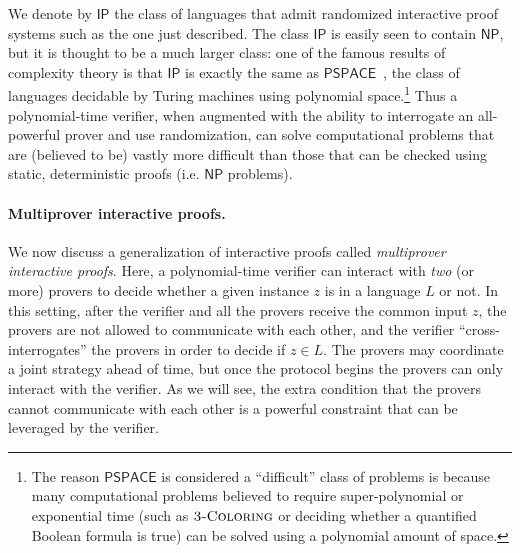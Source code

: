\documentclass[11pt]{article}
\theoremstyle{definition}
\newcommand{\class}[1]{\ensuremath{\mathsf{#1}}\xspace}
\newcommand{\NP}{\class{NP}} %
\newcommand{\IP}{\class{IP}} %
\newcommand{\tnote}[1]{}
\newcommand{\hnote}[1]{}
\begin{document}

We denote by $\IP$ the class of languages that admit randomized interactive proof systems such as the one just described. 
The class $\IP$ is easily seen to contain $\NP$, but it is thought to be a much larger class: one of the famous results of complexity theory is that $\IP$ is exactly the same as $\mathsf{PSPACE}$~\cite{lund1990algebraic,shamir1990ip}, the class of languages decidable by Turing machines using polynomial space.\footnote{The reason $\mathsf{PSPACE}$ is considered a ``difficult'' class of problems is because many computational problems believed to require super-polynomial or exponential time (such as $\textsc{3-Coloring}$ or deciding whether a quantified Boolean formula is true) can be solved using a polynomial amount of space.} Thus a polynomial-time verifier, when augmented with the ability to interrogate an all-powerful prover and use randomization, can solve computational problems that are (believed to be) vastly more difficult than those that can be checked using static, deterministic proofs (i.e. $\mathsf{NP}$ problems).

\paragraph{Multiprover interactive proofs.}
We now discuss a generalization of interactive proofs called \emph{multiprover interactive proofs}. Here, a polynomial-time verifier can interact with \emph{two} (or more) provers to decide whether a given instance $z$ is in a language $L$ or not. In this setting, after the verifier and all the provers receive the common input $z$, the provers are not allowed to communicate with each other, and the verifier ``cross-interrogates'' the provers in order to decide if $z \in L$. The provers may coordinate a joint strategy ahead of time, but once the protocol begins the provers can only interact with the verifier. As we will see, the extra condition that the provers cannot communicate with each other is a powerful constraint that can be leveraged by the verifier.
\end{document}
